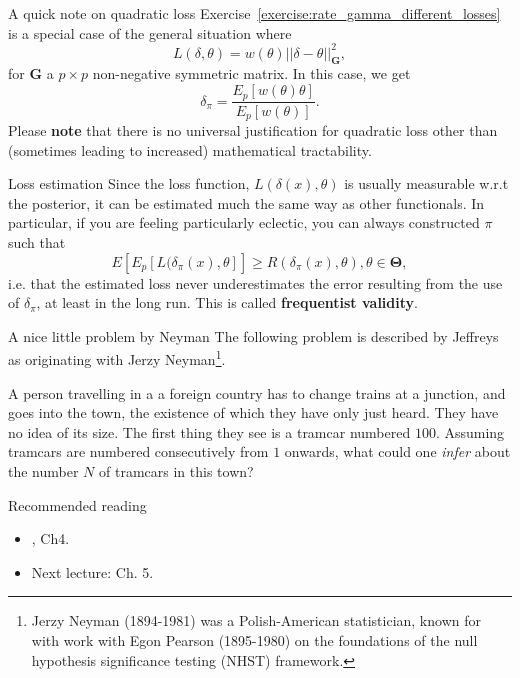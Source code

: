 \begin{frame}{A quick note on quadratic loss}
 Exercise~\ref{exercise:rate_gamma_different_losses} is a special case of the general situation where 
 $$ L(\delta, \theta) = w(\theta) ||\delta-\theta||_{\boldsymbol{G}}^2, $$
 for $\boldsymbol{G}$ a $p \times p$ non-negative symmetric matrix.
 In this case, we get
 $$ \delta_\pi = \frac{E_p[w(\theta)\theta]}{E_p[w(\theta)]}. $$
 Please \textbf{note} that there is no universal justification for quadratic loss other than (sometimes leading to increased) mathematical tractability.
\end{frame}
\begin{frame}{Loss estimation}
 Since the loss function, $L(\delta(x), \theta)$ is usually measurable w.r.t the posterior, it can be estimated much the same way as other functionals.
 In particular, if you are feeling particularly eclectic, you can always constructed $\pi$ such that
 $$ E\left[E_p[L(\delta_\pi(x), \theta]\right] \geq R(\delta_\pi(x), \theta),  \theta \in \boldsymbol{\Theta}, $$
 i.e. that the estimated loss never underestimates the error resulting from the use of $\delta_\pi$, at least in the long run.
 This is called \textbf{frequentist validity}.
 \end{frame}
\begin{frame}{A nice little problem by Neyman}
The following problem is described by Jeffreys as originating with Jerzy Neyman\footnote{Jerzy Neyman (1894-1981) was a Polish-American statistician, known for with work with Egon Pearson (1895-1980) on the foundations of the null hypothesis significance testing (NHST) framework.}.
\begin{exercise}
 \label{exercise:tramcar}
 A person travelling in a a foreign country has to change trains at a junction, and goes into the town, the existence of which they have only just heard.
 They have no idea of its size.
 The first thing they see is a tramcar numbered $100$.
 Assuming tramcars are numbered consecutively from $1$ onwards, what could one \textit{infer} about the number $N$ of tramcars in this town?
\end{exercise}
\end{frame}

\begin{frame}{Recommended reading}
\begin{itemize}
  \item[\faBook] \cite{Robert2007}, Ch4.
 \item[\faForward] Next lecture: \cite{Robert2007} Ch. 5.
 \end{itemize} 
\end{frame}
